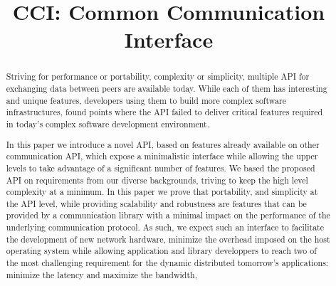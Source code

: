 \documentclass[conference]{IEEEtran}
\begin{document}
%
\title{CCI: Common Communication Interface}
% 
\author{
  }

\maketitle

\begin{abstract}
  Striving for performance or portability, complexity or simplicity,
  multiple API for exchanging data between peers are available
  today. While each of them has interesting and unique features,
  developers using them to build more complex software
  infrastructures, found points where the API failed to
  deliver critical features required in today's complex software
  development environment. 

  In this paper we introduce a novel API, based on features already
  available on other communication API, which expose a minimalistic
  interface while allowing the upper levels to take advantage of a
  significant number of features. We based the proposed API on
  requirements from our diverse backgrounds, triving to keep the high
  level complexity at a minimum. In this paper we prove that
  portability, and simplicity at the API level, while providing
  scalability and robustness are features that can be provided by a
  communication library with a minimal impact on the performance of
  the underlying communication protocol. As such, we expect such an
  interface to facilitate the development of new network hardware,
  minimize the overhead imposed on the host operating system while
  allowing application and library developpers to reach two of the
  most challenging requirement for the dynamic distributed tomorrow's
  applications: minimize the latency and maximize the bandwidth,

\end{abstract}

\end{document}

